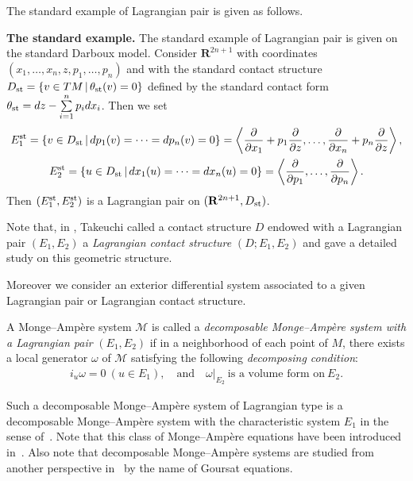 \documentclass[11pt]{article}
\begin{document}
The standard example of Lagrangian pair is given as follows.

{\bf The standard example.}
The standard example of Lagrangian pair is given on
the standard Darboux model.
Consider ${\mathbf{R}}^{2n+1}$ with coordinates
$(x_1,\dots,x_n,z,p_1,\dots,p_n)$ and with the standard
contact structure
$D_{\rm{st}} = \{ v \in TM \,|\, \theta_{\rm{st}}(v) = 0\}$ def\/ined by
the standard contact form
$\theta_{\rm{st}} = dz - \sum\limits_{i=1}^np_idx_i$.
Then we set
\begin{gather*}
E^{\rm{st}}_1   =
\{ v \in D_{\rm{st}} \,|\,
dp_1(v) = \cdots = dp_n(v) = 0 \} = \left\langle \frac{\partial}{\partial x_1} +
p_1\frac{\partial}{\partial z},
\dots, \frac{\partial}{\partial x_n} + p_n\frac{\partial}{\partial z}\right\rangle,
\\
E^{\rm{st}}_2  =
\{ u \in D_{\rm{st}} \,|\,
dx_1(u) = \cdots = dx_n(u) = 0\} =
\left\langle \frac{\partial}{\partial p_1},
\dots, \frac{\partial}{\partial p_n}\right\rangle.
\end{gather*}
Then $(E^{\rm{st}}_1, E^{\rm{st}}_2)$ is a Lagrangian pair on
$({\mathbf{R}}^{2n+1}, D_{\rm{st}})$.


Note that,
in \cite{Tak}, Takeuchi called
a contact structure $D$ endowed with a Lagrangian pair $(E_1,E_2)$
a {\it Lagrangian contact structure} $(D; E_1,E_2)$ and
gave a detailed study on this geometric structure.

Moreover we consider an exterior dif\/ferential system associated to a given
Lagrangian pair or Lagrangian contact structure.

\begin{Def}
A Monge--Amp{\`e}re system $\mathcal{M}$ is called
a {\it decomposable Monge--Amp{\`e}re system with a Lagrangian pair} $(E_1,E_2)$
if in a neighborhood of each point of $M$, there exists a local generator $\omega$
of $\mathcal{M}$
satisfying the following {\it decomposing condition}:
\begin{gather*}
i_u\omega = 0\ (u\in E_1), \quad \text{and} \quad
\omega\vert_{E_2}\ \text{is a volume form on}\ E_2.
\end{gather*}
\end{Def}

Such a decomposable Monge--Amp{\`e}re system
of Lagrangian type is a decomposable Monge--Amp{\`e}re system with
the characteristic system $E_1$ in the sense of~\cite{M-M}.
Note that this class of Monge--Amp{\`e}re equations have been introduced in~\cite{G}.
Also note that decomposable Monge--Amp{\`e}re systems are studied from another perspective in~\cite{A-B-M-P} by the name of Goursat equations.
\end{document}
